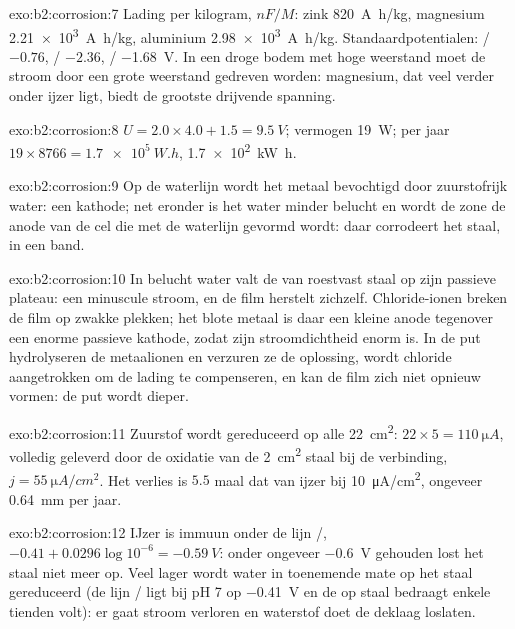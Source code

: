 \begin{solution}{exo:b2:corrosion:7}
Lading per kilogram, $nF/M$: zink \qty{820}{A.h/kg}, magnesium \qty{2.21e3}{A.h/kg},
aluminium \qty{2.98e3}{A.h/kg}. Standaardpotentialen: / $-0.76$,
/ $-2.36$, / \qty{-1.68}{V}. In een droge bodem met hoge weerstand
moet de stroom door een grote weerstand gedreven worden: magnesium, dat veel verder
onder ijzer ligt, biedt de grootste drijvende spanning.
\end{solution}

\begin{solution}{exo:b2:corrosion:8}
$U = 2.0 \times 4.0 + 1.5 = \qty{9.5}{V}$; vermogen \qty{19}{W}; per jaar $19 \times
8766 = \qty{1.7e5}{W.h}$, \qty{1.7e2}{kW.h}.
\end{solution}

\begin{solution}{exo:b2:corrosion:9}
Op de waterlijn wordt het metaal bevochtigd door zuurstofrijk water: een kathode; net
eronder is het water minder belucht en wordt de zone de anode van de cel die
met de waterlijn gevormd wordt: daar corrodeert het staal, in een band.
\end{solution}

\begin{solution}{exo:b2:corrosion:10}
In belucht water valt de  van roestvast staal op zijn
passieve plateau: een minuscule stroom, en de film herstelt zichzelf. Chloride-ionen breken
de film op zwakke plekken; het blote metaal is daar een kleine anode tegenover een
enorme passieve kathode, zodat zijn stroomdichtheid enorm is. In de put
hydrolyseren de metaalionen en verzuren ze de oplossing, wordt chloride aangetrokken om
de lading te compenseren, en kan de film zich niet opnieuw vormen: de put wordt dieper.
\end{solution}

\begin{solution}{exo:b2:corrosion:11}
Zuurstof wordt gereduceerd op alle \qty{22}{cm^2}:  $22 \times 5 =
\qty{110}{\micro A}$, volledig geleverd door de oxidatie van de \qty{2}{cm^2} staal
bij de verbinding, $j = \qty{55}{\micro A/cm^2}$. Het verlies is $5.5$ maal dat van ijzer
bij \qty{10}{\micro A/cm^2}, ongeveer \qty{0.64}{mm} per jaar.
\end{solution}

\begin{solution}{exo:b2:corrosion:12}
IJzer is immuun onder de lijn /, $-0.41 + 0.0296\log 10^{-6} =
\qty{-0.59}{V}$: onder ongeveer \qty{-0.6}{V} gehouden lost het staal niet meer op. Veel
lager wordt water in toenemende mate op het staal gereduceerd (de lijn / ligt bij pH 7 op
\qty{-0.41}{V} en de  op staal bedraagt enkele tienden volt):
er gaat stroom verloren en waterstof doet de deklaag loslaten.
\end{solution}

